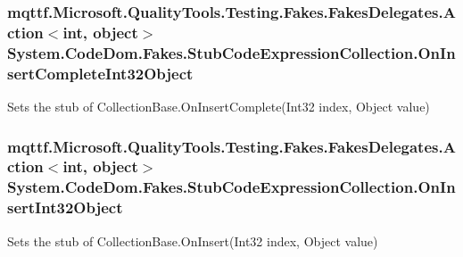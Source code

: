 \hypertarget{class_system_1_1_code_dom_1_1_fakes_1_1_stub_code_expression_collection_a0a25d95870727372efeee23e72269ae4}{
\subsubsection[{On\-Insert\-Complete\-Int32\-Object}]{\setlength{\rightskip}{0pt plus 5cm}mqttf.\-Microsoft.\-Quality\-Tools.\-Testing.\-Fakes.\-Fakes\-Delegates.\-Action$<$int, object$>$ System.\-Code\-Dom.\-Fakes.\-Stub\-Code\-Expression\-Collection.\-On\-Insert\-Complete\-Int32\-Object}}\label{class_system_1_1_code_dom_1_1_fakes_1_1_stub_code_expression_collection_a0a25d95870727372efeee23e72269ae4}


Sets the stub of Collection\-Base.\-On\-Insert\-Complete(\-Int32 index, Object value)

\hypertarget{class_system_1_1_code_dom_1_1_fakes_1_1_stub_code_expression_collection_a21bfe0937a929b70ac44c44fc1f13545}{
\subsubsection[{On\-Insert\-Int32\-Object}]{\setlength{\rightskip}{0pt plus 5cm}mqttf.\-Microsoft.\-Quality\-Tools.\-Testing.\-Fakes.\-Fakes\-Delegates.\-Action$<$int, object$>$ System.\-Code\-Dom.\-Fakes.\-Stub\-Code\-Expression\-Collection.\-On\-Insert\-Int32\-Object}}\label{class_system_1_1_code_dom_1_1_fakes_1_1_stub_code_expression_collection_a21bfe0937a929b70ac44c44fc1f13545}


Sets the stub of Collection\-Base.\-On\-Insert(\-Int32 index, Object value)

